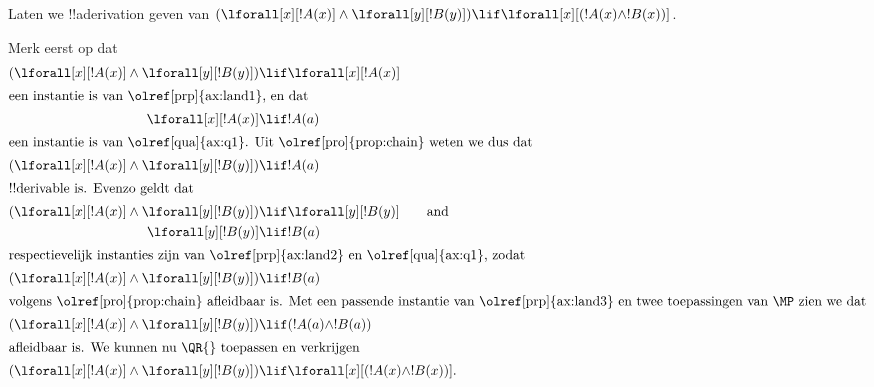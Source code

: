 \documentclass[../../../include/open-logic-section]{subfiles}
\begin{document}


\begin{ex}
Laten we !!a{derivation} geven van $(\lforall[x][!A(x)] \land
\lforall[y][!B(y)]) \lif \lforall[x][(!A(x) \land !B(x))]$.

Merk eerst op dat
\begin{align*}
  (\lforall[x][!A(x)] \land \lforall[y][!B(y)]) & \lif \lforall[x][!A(x)]\\
  \intertext{een instantie is van \olref[prp]{ax:land1}, en dat}
  \lforall[x][!A(x)] & \lif !A(a) \\
  \intertext{een instantie is van \olref[qua]{ax:q1}. Uit \olref[pro]{prop:chain} weten we dus dat}
  (\lforall[x][!A(x)] \land \lforall[y][!B(y)]) & \lif !A(a) \\
  \intertext{!!{derivable} is. Evenzo geldt dat}
  (\lforall[x][!A(x)] \land \lforall[y][!B(y)]) & \lif \lforall[y][!B(y)] \qquad\text{and}\\
    \lforall[y][!B(y)] & \lif !B(a)\\
    \intertext{respectievelijk instanties zijn van \olref[prp]{ax:land2} en \olref[qua]{ax:q1}, zodat}
    (\lforall[x][!A(x)] \land \lforall[y][!B(y)]) & \lif !B(a)\\
    \intertext{volgens \olref[pro]{prop:chain} afleidbaar is. Met een passende instantie van \olref[prp]{ax:land3} en twee toepassingen van~\MP zien we dat}
    (\lforall[x][!A(x)] \land \lforall[y][!B(y)]) & \lif (!A(a) \land !B(a))\\
    \intertext{afleidbaar is. We kunnen nu \QR{} toepassen en verkrijgen}
(\lforall[x][!A(x)] \land \lforall[y][!B(y)]) & \lif \lforall[x][(!A(x) \land !B(x))].
\end{align*}
\end{ex}
\end{document}
